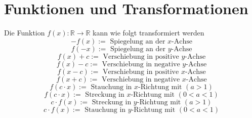 \section{Funktionen und Transformationen}
Die Funktion $f\left(x\right):\mathbb{R}\rightarrow \mathbb{R}$ kann wie folgt transformiert werden
\begin{equation}
\boxed{-f(x):=\text{ Spiegelung an der }x\text{-Achse}}
\end{equation}
\begin{equation}
\boxed{f(-x):=\text{ Spiegelung an der }y\text{-Achse}}
\end{equation}
\begin{equation}
\boxed{f(x)+c:=\text{ Verschiebung in positive }y\text{-Achse}}
\end{equation}
\begin{equation}
\boxed{f(x)-c:=\text{ Verschiebung in negative }y\text{-Achse}}
\end{equation}
\begin{equation}
\boxed{f(x-c):=\text{ Verschiebung in positive }x\text{-Achse}}
\end{equation}
\begin{equation}
\boxed{f(x+c):=\text{ Verschiebung in negative }x\text{-Achse}}
\end{equation}
\begin{equation}
\boxed{f(c\cdot x):=\text{ Stauchung in }x\text{-Richtung mit }(a>1)}
\end{equation}
\begin{equation}
\boxed{f(c\cdot x):=\text{ Streckung in }x\text{-Richtung mit }(0<a<1)}
\end{equation}
\begin{equation}
\boxed{c\cdot f(x):=\text{ Streckung in }y\text{-Richtung mit }(a>1)}
\end{equation}
\begin{equation}
\boxed{c\cdot f(x):=\text{ Stauchung in }y\text{-Richtung mit }(0<a<1)}
\end{equation}